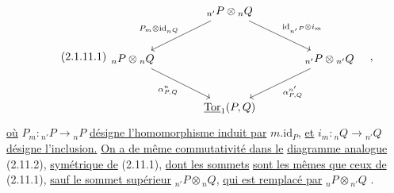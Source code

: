 \begin{equation}\tag{2.1.11.1}
\begin{tikzcd}[column sep=large, row sep=large]
 & {{}_{n'}P \otimes {}_{n}Q} \arrow[ld, "P_m \otimes \mathrm{id}_{{}_{n}Q}"'] \arrow[rd, "\mathrm{id}_{{}_{n'}P} \otimes i_m"] & \\
{{}_{n}P \otimes {}_{n}Q} \arrow[rd, "{\alpha^{n}_{P,Q}}"'] & & {{}_{n'}P \otimes {}_{n'}Q} \arrow[ld, "{\alpha^{n'}_{P,Q}}"] \\
 & {\underline{\mathrm{Tor}}_1(P,Q)} &
\end{tikzcd}\quad ,
\end{equation}
\underline{où} $P_m : {}_{n'}P \longrightarrow {}_{n}P$ \underline{désigne l'homomorphisme induit par} $m.\mathrm{id}_P$, \underline{et} $i_m : {}_{n}Q \longrightarrow {}_{n'}Q$ \underline{désigne l'inclusion.} \underline{On a de même commutativité dans le} \underline{diagramme analogue} (2.11.2), \underline{symétrique de} (2.11.1), \underline{dont les sommets} \underline{sont les mêmes que ceux de} (2.11.1), \underline{sauf le sommet supérieur} ${}_{n'}P \otimes {}_{n}Q$, \underline{qui est remplacé par} ${}_{n}P \otimes {}_{n'}Q$ .

